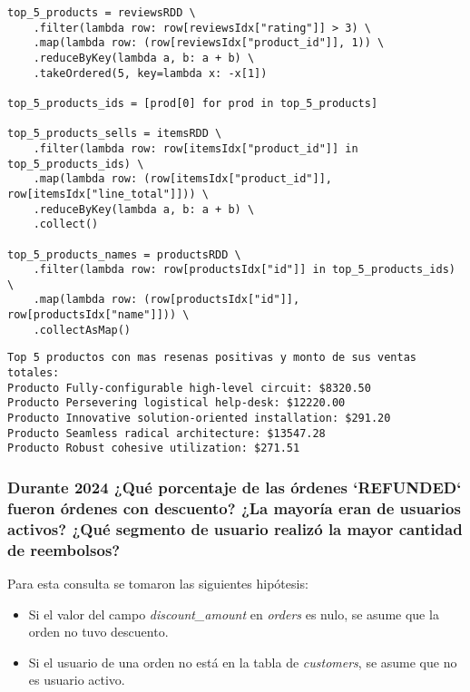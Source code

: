 \begin{lstlisting}[caption={Resolución de la consulta 1 propuesta propia.}, xleftmargin=20pt, xrightmargin=20pt]
top_5_products = reviewsRDD \
    .filter(lambda row: row[reviewsIdx["rating"]] > 3) \
    .map(lambda row: (row[reviewsIdx["product_id"]], 1)) \
    .reduceByKey(lambda a, b: a + b) \
    .takeOrdered(5, key=lambda x: -x[1])

top_5_products_ids = [prod[0] for prod in top_5_products]

top_5_products_sells = itemsRDD \
    .filter(lambda row: row[itemsIdx["product_id"]] in top_5_products_ids) \
    .map(lambda row: (row[itemsIdx["product_id"]], row[itemsIdx["line_total"]])) \
    .reduceByKey(lambda a, b: a + b) \
    .collect()

top_5_products_names = productsRDD \
    .filter(lambda row: row[productsIdx["id"]] in top_5_products_ids) \
    .map(lambda row: (row[productsIdx["id"]], row[productsIdx["name"]])) \
    .collectAsMap()
\end{lstlisting}

\begin{lstlisting}[style=console, caption=Resultados de la consulta 1 propuesta propia, label={lst:propia_q1_results}, xleftmargin=30pt, xrightmargin=30pt]
Top 5 productos con mas resenas positivas y monto de sus ventas totales:
Producto Fully-configurable high-level circuit: $8320.50
Producto Persevering logistical help-desk: $12220.00
Producto Innovative solution-oriented installation: $291.20
Producto Seamless radical architecture: $13547.28
Producto Robust cohesive utilization: $271.51
\end{lstlisting}

\subsubsection{Durante 2024 ¿Qué porcentaje de las órdenes `REFUNDED` fueron órdenes con descuento? ¿La mayoría eran de usuarios activos? ¿Qué segmento de usuario realizó la mayor cantidad de reembolsos?}
Para esta consulta se tomaron las siguientes hipótesis:
\begin{itemize}
    \item Si el valor del campo \textit{discount\_amount} en \textit{orders} es nulo, se asume que la orden no tuvo descuento.
    \item Si el usuario de una orden no está en la tabla de \textit{customers}, se asume que no es usuario activo.
\end{itemize}

